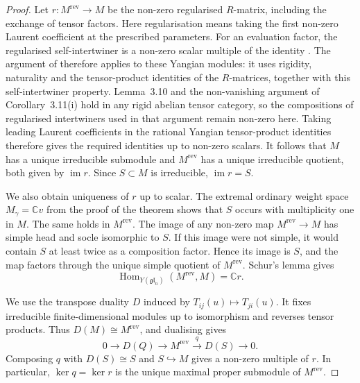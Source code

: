 \documentclass[12pt,reqno]{amsart}
\newcommand{\C}{{\mathbb C}}
\numberwithin{equation}{section}
\begin{document}
\begin{proof}
Let $r:M^{\mathrm{rev}}\to M$ be the non-zero regularised
$R$-matrix, including the exchange of tensor factors. Here
regularisation means taking the first non-zero Laurent coefficient
at the prescribed parameters. For an evaluation factor, the
regularised self-intertwiner is a non-zero scalar multiple of the
identity \cite[Proposition~4.7]{NTBlockFusion2002}.
The argument of \cite[Lemma~3.10, Corollary~3.11 and
Theorem~3.12]{KKKO2015}
therefore applies to these Yangian modules: it uses rigidity,
naturality and the tensor-product identities of the $R$-matrices,
together with this self-intertwiner property. Lemma~3.10 and the
non-vanishing argument of Corollary~3.11(i) hold in any rigid
abelian tensor category, so the compositions of regularised
intertwiners used in that argument remain non-zero here.
Taking leading Laurent coefficients in the rational Yangian
tensor-product identities therefore gives the required identities
up to non-zero scalars. It follows that
$M$ has a unique irreducible submodule and $M^{\mathrm{rev}}$
has a unique irreducible quotient, both given by $\operatorname{im}r$.
Since $S\subset M$ is irreducible, $\operatorname{im}r=S$.

We also obtain uniqueness of $r$ up to scalar. The extremal ordinary
weight space $M_\gamma=\C v$ from the proof of the theorem shows
that $S$ occurs with multiplicity one in $M$. The same holds in
$M^{\mathrm{rev}}$. The image of any non-zero map
$M^{\mathrm{rev}}\to M$ has simple head and socle isomorphic to
$S$. If this image were not simple, it would contain $S$ at least
twice as a composition factor. Hence its image is $S$, and the
map factors through the unique simple quotient of
$M^{\mathrm{rev}}$. Schur's lemma gives
\begin{equation*}
    \operatorname{Hom}_{Y(\mathfrak{gl}_n)}(M^{\mathrm{rev}},M)
    =\C r.
\end{equation*}

We use the transpose duality $D$ induced by
$T_{ij}(u)\mapsto T_{ji}(u)$. It fixes irreducible
finite-dimensional modules up to isomorphism and reverses tensor
products. Thus $D(M)\cong M^{\mathrm{rev}}$, and dualising gives
\begin{equation*}
    0\longrightarrow D(Q)\longrightarrow M^{\mathrm{rev}}
    \overset{q}{\longrightarrow}D(S)\longrightarrow0.
\end{equation*}
Composing $q$ with $D(S)\cong S$ and $S\hookrightarrow M$
gives a non-zero multiple of $r$. In particular,
$\ker q=\ker r$ is the unique maximal proper submodule of
$M^{\mathrm{rev}}$.


\end{proof}
\end{document}
